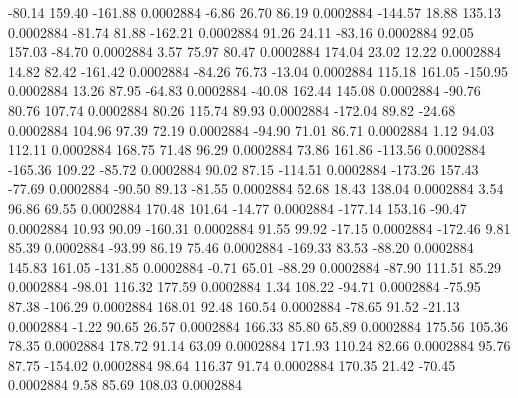       -80.14      159.40     -161.88     0.0002884
       -6.86       26.70       86.19     0.0002884
     -144.57       18.88      135.13     0.0002884
      -81.74       81.88     -162.21     0.0002884
       91.26       24.11      -83.16     0.0002884
       92.05      157.03      -84.70     0.0002884
        3.57       75.97       80.47     0.0002884
      174.04       23.02       12.22     0.0002884
       14.82       82.42     -161.42     0.0002884
      -84.26       76.73      -13.04     0.0002884
      115.18      161.05     -150.95     0.0002884
       13.26       87.95      -64.83     0.0002884
      -40.08      162.44      145.08     0.0002884
      -90.76       80.76      107.74     0.0002884
       80.26      115.74       89.93     0.0002884
     -172.04       89.82      -24.68     0.0002884
      104.96       97.39       72.19     0.0002884
      -94.90       71.01       86.71     0.0002884
        1.12       94.03      112.11     0.0002884
      168.75       71.48       96.29     0.0002884
       73.86      161.86     -113.56     0.0002884
     -165.36      109.22      -85.72     0.0002884
       90.02       87.15     -114.51     0.0002884
     -173.26      157.43      -77.69     0.0002884
      -90.50       89.13      -81.55     0.0002884
       52.68       18.43      138.04     0.0002884
        3.54       96.86       69.55     0.0002884
      170.48      101.64      -14.77     0.0002884
     -177.14      153.16      -90.47     0.0002884
       10.93       90.09     -160.31     0.0002884
       91.55       99.92      -17.15     0.0002884
     -172.46        9.81       85.39     0.0002884
      -93.99       86.19       75.46     0.0002884
     -169.33       83.53      -88.20     0.0002884
      145.83      161.05     -131.85     0.0002884
       -0.71       65.01      -88.29     0.0002884
      -87.90      111.51       85.29     0.0002884
      -98.01      116.32      177.59     0.0002884
        1.34      108.22      -94.71     0.0002884
      -75.95       87.38     -106.29     0.0002884
      168.01       92.48      160.54     0.0002884
      -78.65       91.52      -21.13     0.0002884
       -1.22       90.65       26.57     0.0002884
      166.33       85.80       65.89     0.0002884
      175.56      105.36       78.35     0.0002884
      178.72       91.14       63.09     0.0002884
      171.93      110.24       82.66     0.0002884
       95.76       87.75     -154.02     0.0002884
       98.64      116.37       91.74     0.0002884
      170.35       21.42      -70.45     0.0002884
        9.58       85.69      108.03     0.0002884
